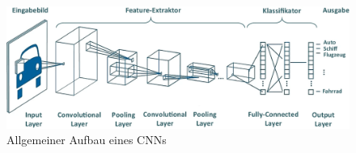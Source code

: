 \begin{figure}[!h]
	\centering
	\includegraphics[width=\linewidth]{images/imgKlassifizierungProzess}
	\caption{Allgemeiner Aufbau eines CNNs \protect\cite{Zschech2021}}
	\label{fig:imgKlassifizierungProzess}
\end{figure}

